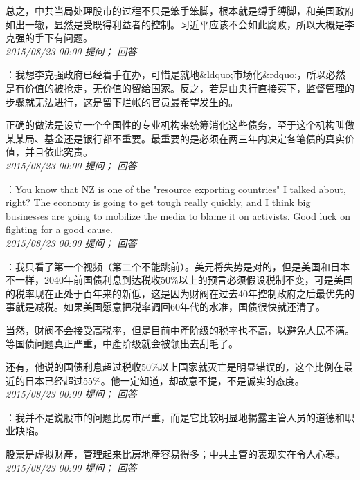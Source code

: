 \documentclass[twocolumn]{ctexart}
\begin{document}
总之，中共当局处理股市的过程不只是笨手笨脚，根本就是缚手缚脚，和美国政府如出一辙，显然是受既得利益者的控制。习近平应该不会如此腐败，所以大概是李克强的手下有问题。\\

\textit{\hfill\noindent\small 2015/08/23 00:00 提问； 回答}

：我想李克强政府已经着手在办，可惜是就地\&ldquo;市场化\&rdquo;，所以必然是有价值的被抢走，无价值的留给国家。反之，若是由央行直接买下，监督管理的步骤就无法进行，这是留下烂帐的官员最希望发生的。

正确的做法是设立一个全国性的专业机构来统筹消化这些债务，至于这个机构叫做某某局、基金还是银行都不重要。最重要的是必须在两三年内决定各笔债的真实价值，并且依此究责。\\

\textit{\hfill\noindent\small 2015/08/23 00:00 提问； 回答}

：You know that  NZ is one of the "resource exporting countries" I talked about, right? The economy is going to get tough really quickly, and I think big businesses are going to mobilize the media to blame it on activists. Good luck on fighting for a good cause.\\

\textit{\hfill\noindent\small 2015/08/23 00:00 提问； 回答}

：我只看了第一个视频（第二个不能跳前）。美元将失势是对的，但是美国和日本不一样，2040年前国债利息到达税收50\%以上的预言必须假设税制不变，可是美国的税率现在正处于百年来的新低，这是因为财阀在过去40年控制政府之后最优先的事就是减税。如果美国愿意把税率调回60年代的水准，国债很快就还清了。

当然，财阀不会接受高税率，但是目前中產阶级的税率也不高，以避免人民不满。等国债问题真正严重，中產阶级就会被领出去刮毛了。

还有，他说的国债利息超过税收50\%以上国家就灭亡是明显错误的，这个比例在最近的日本已经超过55\%。他一定知道，却故意不提，不是诚实的态度。\\

\textit{\hfill\noindent\small 2015/08/23 00:00 提问； 回答}

：我并不是说股市的问题比房市严重，而是它比较明显地揭露主管人员的道德和职业缺陷。

股票是虚拟财產，管理起来比房地產容易得多；中共主管的表现实在令人心寒。\\

\textit{\hfill\noindent\small 2015/08/23 00:00 提问； 回答}
\end{document}
